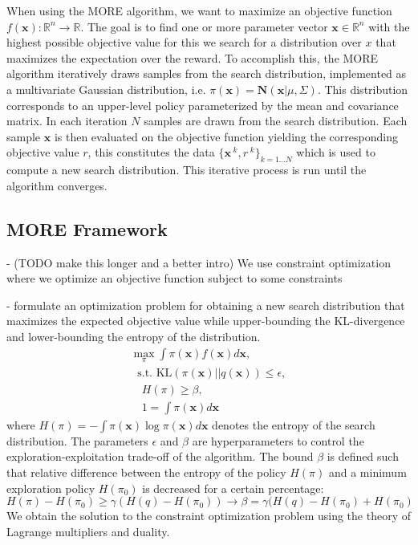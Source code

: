 When using the MORE algorithm, we want to maximize an objective function
$f(\mathbf{x}): \mathbb{R}^n \rightarrow \mathbb{R}$. The goal is
to find one or more parameter vector $\mathbf{x} \in \mathbb{R}^n$ with the
highest possible objective value for this we search for
a distribution over $x$ that maximizes the expectation
over the reward. To accomplish this, the
MORE algorithm iteratively draws samples from the search
distribution, implemented
as a multivariate Gaussian distribution, i.e.
$\pi(\mathbf{x}) = \mathbf{N}(\mathbf{x} | \mu, \Sigma)$.
This distribution corresponds to an upper-level policy
parameterized by the mean and covariance matrix.
In each iteration $N$ samples are drawn from the
search distribution. Each sample $\mathbf{x}$ is then
evaluated on the objective function yielding the corresponding
objective value $r$, this constitutes the data
$\{\mathbf{x}^{\;k}, r^{\;k}\}_{k=1...N}$ which is
used to compute a new search distribution.
This iterative process is run until the algorithm converges.


\subsection{MORE Framework}

- (TODO make this longer and a better intro)
We use constraint optimization \citep{boyd2004convex}
  where we optimize an objective function subject to some constraints

- formulate an optimization problem  for
obtaining a new search distribution that
maximizes the expected objective value while
upper-bounding the KL-divergence and
lower-bounding the entropy of the distribution.
\begin{equation}
  \label{more_opt}
  \begin{aligned}
    \max_{\pi} \int \pi(\mathbf{x}) f(\mathbf{x}) d\mathbf{x}, \\
    \; \text{ s.t. KL}(\pi(\mathbf{x})||q(\mathbf{x})) \leq \epsilon, \\
    \quad H(\pi) \geq \beta, \\
    \quad 1 = \int \pi(\mathbf{x}) d\mathbf{x}
  \end{aligned}
\end{equation}
where $H(\pi) = - \int \pi(\mathbf{x}) \log \pi(\mathbf{x}) d\mathbf{x}$ denotes
the entropy of the search distribution.
The parameters $\epsilon$ and $\beta$ are hyperparameters to control the
exploration-exploitation trade-off of the algorithm.
The bound $\beta$ is defined such that relative difference between the entropy
of the policy $H(\pi)$ and a minimum exploration policy $H(\pi_0)$ is
decreased
for a certain percentage:
$$ H(\pi) - H(\pi_0) \geq \gamma (H(q) - H(\pi_0))
\rightarrow \beta = \gamma (H(q) - H(\pi_0) + H(\pi_0) $$
We obtain the solution to the constraint optimization
problem using the theory of Lagrange multipliers and duality.



